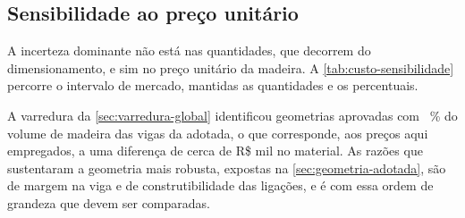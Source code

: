 \subsection{Sensibilidade ao preço unitário}\label{ssec:custo-sensibilidade}

A incerteza dominante não está nas quantidades, que decorrem do dimensionamento,
e sim no preço unitário da madeira. A \autoref{tab:custo-sensibilidade} percorre
o intervalo de mercado, mantidas as quantidades e os percentuais.



A varredura da \autoref{sec:varredura-global} identificou
geometrias aprovadas com \custoPctVolMin~\% do volume de madeira das vigas da
adotada, o que corresponde, aos preços aqui empregados, a uma diferença de cerca de
R\$ \custoDifVolMin{} mil no material. As razões que sustentaram a geometria mais
robusta, expostas na \autoref{sec:geometria-adotada}, são de margem na viga e de
construtibilidade das ligações, e é com essa ordem de grandeza que
devem ser comparadas.
